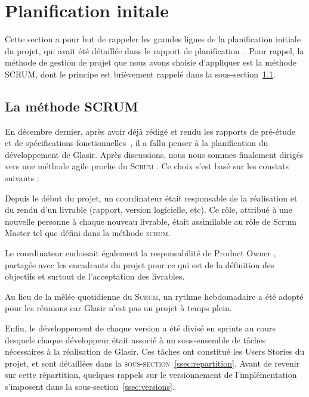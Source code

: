 \section{Planification initale}
\label{sec:planifInit}

Cette section a pour but de rappeler les grandes lignes de la planification initiale du projet, qui avait été détaillée dans le rapport de planification~\cite{planif}. Pour rappel, la méthode de gestion de projet que nous avons choisie d'appliquer est la méthode SCRUM, dont le principe est brièvement rappelé dans la {\sc sous-section}~\ref{ssec:scrum}.

\subsection{La méthode SCRUM}
\label{ssec:scrum}

En décembre dernier, après avoir déjà rédigé et rendu les rapports de pré-étude~\cite{pre_etude} et de spécifications fonctionnelles~\cite{spec_fonc}, il a fallu penser à la planification du développement de Glasir. Après discussions, nous nous sommes finalement dirigés vers une méthode agile proche du \og \textsc{Scrum} \fg{}. Ce choix s'est basé sur les constats suivants :

Depuis le début du projet, un \og coordinateur \fg{} était responsable de la réalisation et du rendu d'un livrable (rapport, version logicielle, etc). Ce rôle, attribué à une nouvelle personne à chaque nouveau livrable, était assimilable au rôle de \og Scrum Master \fg{} tel que défini dans la méthode \textsc{scrum}.

Le coordinateur endossait également la responsabilité de \og Product Owner \fg{}, partagée avec les encadrants du projet pour ce qui est de la définition des objectifs et surtout de l'acceptation des livrables.

Au lieu de la mêlée quotidienne du \textsc{Scrum}, un rythme hebdomadaire a été adopté pour les réunions car Glasir n'est pas un projet à temps plein. 

Enfin, le développement de chaque version a été divisé en sprints au cours desquels chaque développeur était associé à un sous-ensemble de tâches nécessaires à la réalisation de Glasir. Ces tâches ont constitué les \og Users Stories \fg{} du projet, et sont détaillées dans la \textsc{sous-section}~\ref{ssec:repartition}. Avant de revenir sur cette répartition, quelques rappels sur le versionnement de l'implémentation s'imposent dans la {\sc sous-section}~\ref{ssec:versions}.


